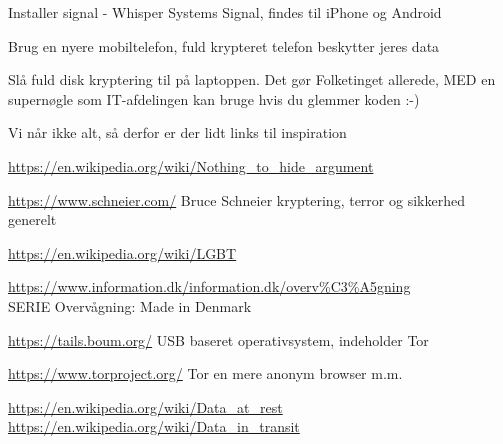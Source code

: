 \documentclass[20pt,landscape,a4paper,footrule]{foils}
\begin{document}


Installer signal - Whisper Systems Signal, findes til iPhone og Android

Brug en nyere mobiltelefon, fuld krypteret telefon beskytter jeres data

Slå fuld disk kryptering til på laptoppen. Det gør Folketinget allerede, MED en supernøgle som IT-afdelingen kan bruge hvis du glemmer koden :-)


\myquestionspage



Vi når ikke alt, så derfor er der lidt links til inspiration

\begin{list2}
\item \url{https://en.wikipedia.org/wiki/Nothing_to_hide_argument}

\item \url{https://www.schneier.com/} Bruce Schneier kryptering, terror og sikkerhed generelt

\item \url{https://en.wikipedia.org/wiki/LGBT}

\item \url{https://www.information.dk/information.dk/overv%C3%A5gning}\\
SERIE Overvågning: Made in Denmark

\item \url{https://tails.boum.org/} USB baseret operativsystem, indeholder Tor

\item \url{https://www.torproject.org/} Tor en mere anonym browser m.m.
\item \url{https://en.wikipedia.org/wiki/Data_at_rest}\\
\url{https://en.wikipedia.org/wiki/Data_in_transit}
\end{list2}
\end{document}
